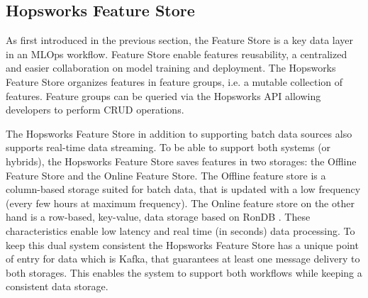 \subsection{Hopsworks Feature Store}

As first introduced in the previous section, the Feature Store is a key data layer in an \gls{MLOps} workflow. Feature Store enable features reusability, a centralized and easier collaboration on model training and deployment. The Hopsworks Feature Store organizes features in feature groups, i.e. a mutable collection of features. Feature groups can be queried via the Hopsworks \gls{API} allowing developers to perform \gls{CRUD} operations.

The Hopsworks Feature Store in addition to supporting batch data sources also supports real-time data streaming. To be able to support both systems (or hybrids), the Hopsworks Feature Store saves features in two storages: the Offline Feature Store and the Online Feature Store. The Offline feature store is a column-based storage suited for batch data, that is updated with a low frequency (every few hours at maximum frequency). The Online feature store on the other hand is a row-based, key-value, data storage based on RonDB \cite{LogicalclocksRondb2024}. These characteristics enable low latency and real time (in seconds) data processing. To keep this dual system consistent the Hopsworks Feature Store has a unique point of entry for data which is Kafka, that guarantees at least one message delivery to both storages. This enables the system to support both workflows while keeping a consistent data storage.